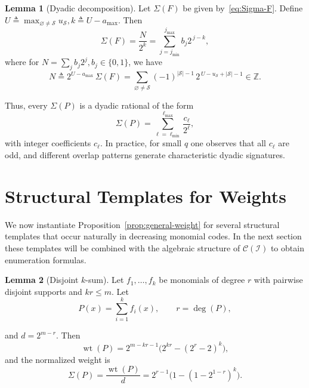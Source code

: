 \documentclass[conference]{IEEEtran}
\theoremstyle{definition}
\newtheorem{lemma}{Lemma}
\newcommand{\wt}{\operatorname{wt}}
\newcommand{\I}{\mathcal{I}}
\newcommand{\C}{\mathcal{C}}
\begin{document}

\begin{lemma}[Dyadic decomposition]
\label{lem:dyadic}
Let $\Sigma(F)$ be given by~\eqref{eq:Sigma-F}. Define
\(
U \triangleq \max_{\varnothing\neq\mathcal S} u_{\mathcal S}, %
k \triangleq U-a_{\max}. 
\)
Then
\[
\Sigma(F) = \frac{N}{2^k}
= \sum_{j=j_{\min}}^{j_{\max}} b_j 2^{\,j-k},
\]
where for $N\!=\!\sum_j b_j 2^j, b_j\!\in\!\{0,1\}$, we have
\[
N \triangleq 2^{U-a_{\max}}\,\Sigma(F)
= \sum_{\varnothing\neq\mathcal S} (-1)^{|\mathcal S|-1}\,2^{\,U-u_{\mathcal S}+|\mathcal S|-1}
\in\mathbb{Z}.
\]
\end{lemma}

Thus, every %
$\Sigma(P)$ 
is a dyadic rational of the form
\[
\Sigma(P) = \sum_{\ell=\ell_{\min}}^{\ell_{\max}} \frac{c_\ell}{2^\ell},
\]
with integer coefficients $c_\ell$. In practice, for small $q$ one observes that all $c_\ell$ are odd, and different overlap patterns generate characteristic dyadic signatures.

\section{Structural Templates for %
Weights}
\label{sec:templates}

We now instantiate Proposition~\ref{prop:general-weight} for several structural templates that occur naturally in decreasing monomial codes. In the next section these templates will be combined with the algebraic structure of $\C(\I)$ to obtain enumeration formulas.


\begin{lemma}[Disjoint $k$-sum]
\label{lem:disjoint-k}
Let $f_1,\dots,f_k$ be monomials of degree $r$ with pairwise disjoint supports and $kr\le m$. Let
\begin{equation}\label{eq:disjoint-k}
    P(x) = \sum_{i=1}^k f_i(x),\qquad r=\deg(P),
\end{equation}

and $d=2^{m-r}$. Then
\begin{equation}\label{eq:weight-disjoint-k}
    \wt(P) = 2^{m-kr-1}\Big(2^{kr} - (2^r-2)^k\Big),
\end{equation}
and the normalized weight is
\begin{equation}
\Sigma(P) =
\frac{\wt(P)}{d}
= 2^{r-1}\Big(1 - (1-2^{1-r})^k\Big).
\label{eq:Sigma-k-sum}
\end{equation}
\end{lemma}
\end{document}
